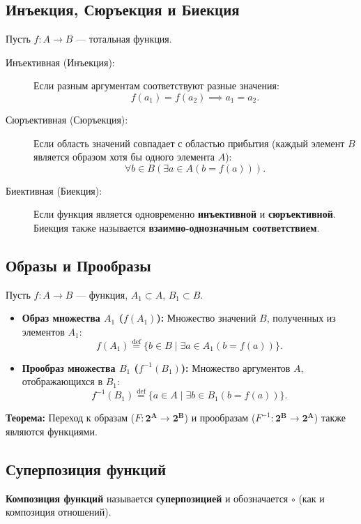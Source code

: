 \subsection*{Инъекция, Сюръекция и Биекция}

Пусть $f: A \to B$ --- тотальная функция.

\begin{description}
    \item[Инъективная (Инъекция):] Если разным аргументам соответствуют разные значения:
    $$f(a_1) = f(a_2) \implies a_1 = a_2.$$
    \item[Сюръективная (Сюръекция):] Если область значений совпадает с областью прибытия (каждый элемент $B$ является образом хотя бы одного элемента $A$):
    $$\forall b \in B (\exists a \in A (b = f(a))).$$
    \item[Биективная (Биекция):] Если функция является одновременно \textbf{инъективной} и \textbf{сюръективной}. Биекция также называется \textbf{взаимно-однозначным соответствием}.
\end{description}

\subsection*{Образы и Прообразы}

Пусть $f: A \to B$ --- функция, $A_1 \subset A$, $B_1 \subset B$.

\begin{itemize}
    \item \textbf{Образ множества $A_1$ ($f(A_1)$):} Множество значений $B$, полученных из элементов $A_1$:
    $$f(A_1) \stackrel{\text{def}}{=} \{b \in B \mid \exists a \in A_1 (b = f(a))\}.$$
    \item \textbf{Прообраз множества $B_1$ ($f^{-1}(B_1)$):} Множество аргументов $A$, отображающихся в $B_1$:
    $$f^{-1}(B_1) \stackrel{\text{def}}{=} \{a \in A \mid \exists b \in B_1 (b = f(a))\}.$$
\end{itemize}
\textbf{Теорема:} Переход к образам ($F: \mathbf{2^A} \to \mathbf{2^B}$) и прообразам ($F^{-1}: \mathbf{2^B} \to \mathbf{2^A}$) также являются функциями.

\subsection*{Суперпозиция функций}

\textbf{Композиция функций} называется \textbf{суперпозицией} и обозначается $\circ$ (как и композиция отношений).

